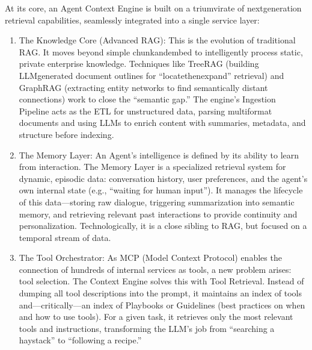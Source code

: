 \documentclass[letterpaper,10pt,english]{sphinxmanual}
\begin{document}
\sphinxAtStartPar
At its core, an Agent Context Engine is built on a triumvirate of next\sphinxhyphen{}generation retrieval capabilities, seamlessly integrated into a single service layer:
\begin{enumerate}
%
\item {} 
\sphinxAtStartPar
The Knowledge Core (Advanced RAG): This is the evolution of traditional RAG. It moves beyond simple chunk\sphinxhyphen{}and\sphinxhyphen{}embed to intelligently process static, private enterprise knowledge. Techniques like TreeRAG (building LLM\sphinxhyphen{}generated document outlines for “locate\sphinxhyphen{}then\sphinxhyphen{}expand” retrieval) and GraphRAG (extracting entity networks to find semantically distant connections) work to close the “semantic gap.” The engine’s Ingestion Pipeline acts as the ETL for unstructured data, parsing multi\sphinxhyphen{}format documents and using LLMs to enrich content with summaries, metadata, and structure before indexing.

\item {} 
\sphinxAtStartPar
The Memory Layer: An Agent’s intelligence is defined by its ability to learn from interaction. The Memory Layer is a specialized retrieval system for dynamic, episodic data: conversation history, user preferences, and the agent’s own internal state (e.g., “waiting for human input”). It manages the lifecycle of this data—storing raw dialogue, triggering summarization into semantic memory, and retrieving relevant past interactions to provide continuity and personalization. Technologically, it is a close sibling to RAG, but focused on a temporal stream of data.

\item {} 
\sphinxAtStartPar
The Tool Orchestrator: As MCP (Model Context Protocol) enables the connection of hundreds of internal services as tools, a new problem arises: tool selection. The Context Engine solves this with Tool Retrieval. Instead of dumping all tool descriptions into the prompt, it maintains an index of tools and—critically—an index of Playbooks or Guidelines (best practices on when and how to use tools). For a given task, it retrieves only the most relevant tools and instructions, transforming the LLM’s job from “searching a haystack” to “following a recipe.”

\end{enumerate}
\end{document}
